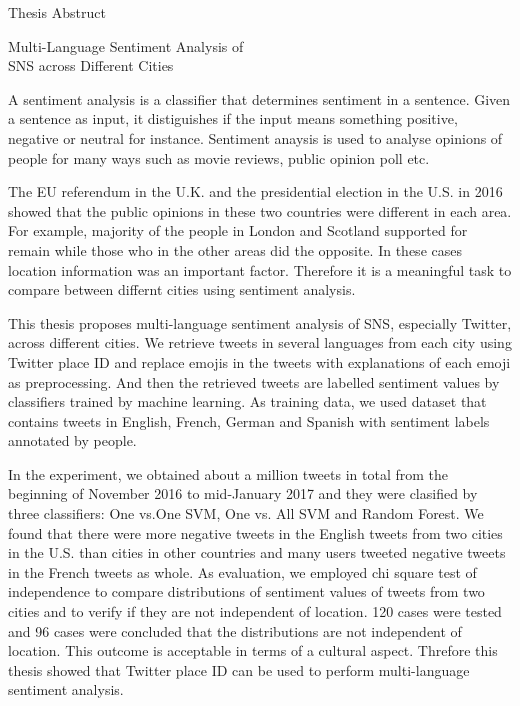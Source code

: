 \newpage

\thispagestyle{empty}
\vspace*{2.0cm}

\begin{center}
\LARGE{Thesis Abstruct}
\end{center}
\vspace{3mm}

\begin{center}
\LARGE{Multi-Language Sentiment Analysis of\\SNS across Different Cities}
\end{center}

\vspace{20mm}
\setlength\parindent{2zw}
A sentiment analysis is a classifier that determines sentiment in a sentence.
Given a sentence as input, it distiguishes if the input means something positive, negative or neutral for instance.
Sentiment anaysis is used to analyse opinions of people for many ways such as movie reviews, public opinion poll etc.

The EU referendum in the U.K. and the presidential election in the U.S. in 2016 showed that the public opinions in these two countries were different in each area.
For example, majority of the people in London and Scotland supported for remain while those who in the other areas did the opposite.
In these cases location information was an important factor.
Therefore it is a meaningful task to compare between differnt cities using sentiment analysis.

This thesis proposes multi-language sentiment analysis of SNS, especially Twitter, across different cities.
We retrieve tweets in several languages from each city using Twitter place ID and replace emojis in the tweets with explanations of each emoji as preprocessing.
And then the retrieved tweets are labelled sentiment values by classifiers trained by machine learning.
As training data, we used dataset that contains tweets in English, French, German and Spanish with sentiment labels annotated by people. 

In the experiment, we obtained about a million tweets in total from the beginning of November 2016 to mid-January 2017 and they were clasified by three classifiers: One vs.One SVM, One vs. All SVM and Random Forest.
We found that there were more negative tweets in the English tweets from two cities in the U.S. than cities in other countries and many users tweeted negative tweets in the French tweets as whole. 
As evaluation, we employed chi square test of independence to compare distributions of sentiment values of tweets from two cities and to verify if they are not independent of location.
120 cases were tested and 96 cases were concluded that the distributions are not independent of location.
This outcome is acceptable in terms of a cultural aspect.
Threfore this thesis showed that Twitter place ID can be used to perform multi-language sentiment analysis.

